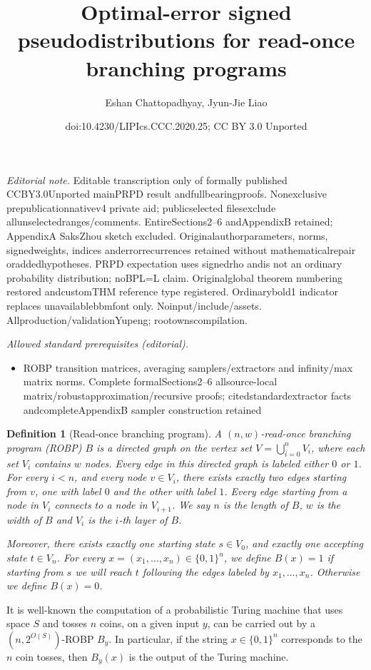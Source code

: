 \documentclass[10pt,a4paper]{article}
\title{Optimal-error signed pseudodistributions for read-once branching programs}
\author{Eshan Chattopadhyay, Jyun-Jie Liao}
\date{doi:10.4230/LIPIcs.CCC.2020.25; CC BY 3.0 Unported}
\newtheorem{definition}[theorem]{Definition}
\newcommand{\bits}[1]{\{0,1\}^{#1}}
\newcommand{\zo}{\{0,1\}}
\begin{document}
\maketitle
\noindent\textit{Editorial note.} Editable transcription only of formally published CCBY3.0Unported mainPRPD result andfullbearingproofs. Nonexclusive prepublicationnativev4 private aid; publicselected filesexclude allunselectedranges/comments. EntireSections2–6 andAppendixB retained; AppendixA SaksZhou sketch excluded. Originalauthorparameters, norms, signedweights, indices anderrorrecurrences retained without mathematicalrepair oraddedhypotheses. PRPD expectation uses signedrho andis not an ordinary probability distribution; noBPL=L claim. Originalglobal theorem numbering restored andcustomTHM reference type registered. Ordinarybold1 indicator replaces unavailablebbmfont only. Noinput/include/assets. Allproduction/validationYupeng; rootownscompilation.\par\medskip
\noindent\textit{Allowed standard prerequisites (editorial).}\begin{itemize}
\item ROBP transition matrices, averaging samplers/extractors and infinity/max matrix norms. Complete formalSections2–6 allsource-local matrix/robustapproximation/recursive proofs; citedstandardextractor facts andcompleteAppendixB sampler construction retained
\end{itemize}\medskip
\begin{definition}[Read-once branching program]
A $(n,w)$-read-once branching program (ROBP) $B$ is a directed graph on the vertex set $V=\bigcup_{i=0}^n V_i$, where each set $V_i$ contains $w$ nodes. Every edge in this directed graph is labeled either $0$ or $1$. For every $i<n$, and every node $v\in V_i$, there exists exactly two edges starting from $v$, one with label $0$ and the other with label $1$. Every edge starting from a node in $V_i$ connects to a node in $V_{i+1}$.
We say $n$ is the \emph{length} of $B$, $w$ is the \emph{width} of $B$ and $V_i$ is the $i$-th \emph{layer} of $B$.

Moreover, there exists exactly one starting state $s\in V_0$, and exactly one accepting state $t\in V_n$. For every $x=(x_1,\dots,x_n)\in\bits{n}$, we define $B(x)=1$ if starting from $s$ we will reach $t$ following the edges labeled by $x_1,\dots,x_n$. Otherwise we define $B(x)=0$.
\end{definition}
It is well-known the computation of a probabilistic Turing machine that uses space $S$ and tosses $n$ coins,  on a given input $y$, can be carried out by a $(n,2^{O(S)})$-ROBP $B_y$. In particular, if the string $x \in \zo^n$ corresponds to the $n$ coin tosses, then  $B_y(x)$ is the output of the Turing machine. 
\end{document}
